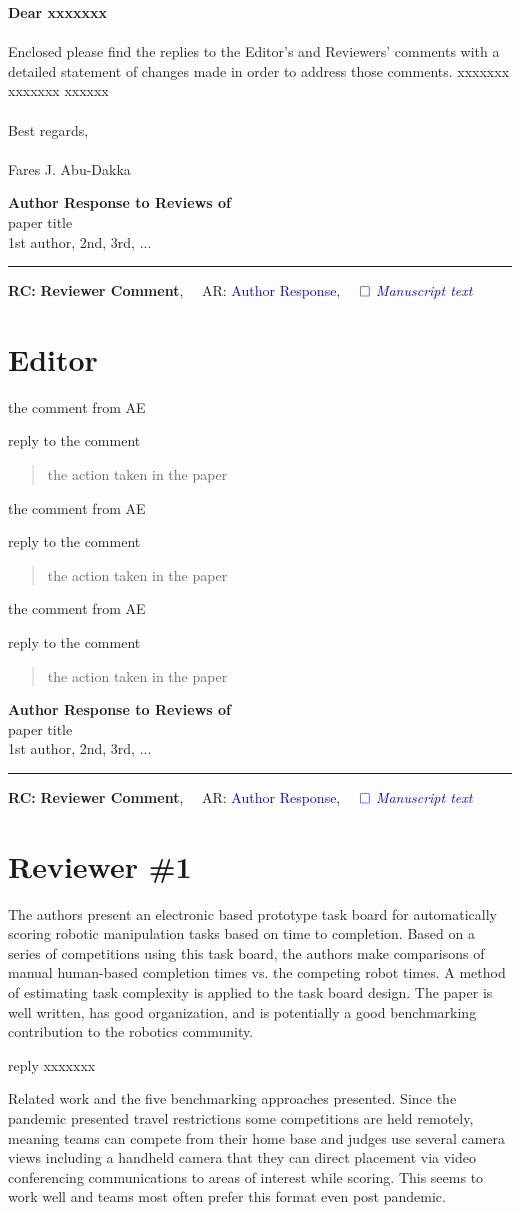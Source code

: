 \documentclass{article}
\def\papertitle{paper title}
\def\authors{1st author, 2nd, 3rd, ...}
\def\Editor{Dear xxxxxxx\\}
\def\Letter{Enclosed please find the replies to the Editor's and Reviewers' comments with a detailed statement of changes made in order to address those comments. xxxxxxx  xxxxxxx  xxxxxx
	\\ \\
	Best regards,\\
	\\
	Fares J. Abu-Dakka
}
\providecommand{\lettertitle}{Author Response to Reviews of}
\providecommand{\papertitle}{Title}
\providecommand{\authors}{Authors}
\providecommand{\journal}{Journal}
\providecommand{\doi}{--}
\providecommand{\Editor}{Name}
\providecommand{\Letter}{Body}
\def\headall{
{\Large\bf \lettertitle}\\[1em]
{\Large \papertitle}\\[1em]
{\authors}\\
\hrule

\hfill {\bfseries RC:} \textbf{{Reviewer Comment}},\(\quad\) AR: \textcolor{blue}{Author Response}, \(\quad\textcolor{blue}{\square}\) \emph{\textcolor{blue}{Manuscript text}}}
\begin{document}
{\Large\bf \Editor}\\[1em]
{\large\Letter}\\[1em]
\newpage
\headall











\section{Editor}

\RC the comment from AE

\AR reply to the comment
\begin{quote}
	the action taken in the paper
\end{quote}

\RC the comment from AE

\AR reply to the comment
\begin{quote}
	the action taken in the paper
\end{quote}

\RC the comment from AE

\AR reply to the comment
\begin{quote}
	the action taken in the paper
\end{quote}



\newpage
\headall
\section{Reviewer \#1}
\RC The authors present an electronic based prototype task board for automatically scoring robotic manipulation tasks based on time to completion.  Based on a series of competitions using this task board, the authors make comparisons of manual human-based completion times vs. the competing robot times.  A method of estimating task complexity is applied to the task board design.  The paper is well written, has good organization, and is potentially a good benchmarking contribution to
the robotics community.

\AR reply xxxxxxx

\RC Related work and the five benchmarking approaches presented.  Since the pandemic presented travel restrictions some competitions are held remotely, meaning teams can compete from their home base and judges use several camera views including a handheld camera that they can direct placement via video conferencing communications to areas of interest while scoring.	This seems to work well and teams most often prefer this format even post pandemic.
\end{document}
